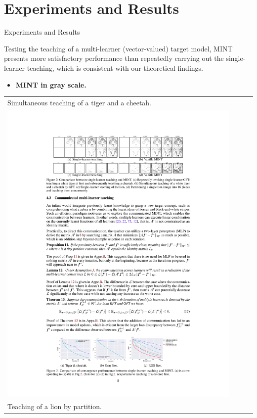 \documentclass[aspectratio=169,xcolor=dvipsnames]{beamer}
\begin{document}
\section{Experiments and Results}
\begin{frame}{Experiments and Results}

\justify
Testing the teaching of a \alert{multi-learner (vector-valued) target model}, MINT presents more satisfactory performance than repeatedly carrying out the single-learner teaching, which is \alert{consistent with our theoretical findings}.

\vspace{1mm}
\begin{itemize}
    \item {\bf MINT in gray scale.}
\end{itemize}
\centering
\begin{tabular}{lclc}
{\scriptsize \color{blue} Simultaneous teaching of a tiger and a cheetah.} \vspace{-2mm}\\

\includegraphics[width=0.85\linewidth]{./out/grayTigerCheetah}\\
{\scriptsize \color{blue} Teaching of a lion by partition.}\vspace{-1mm}\\


\end{tabular}
\end{frame}
\end{document}
